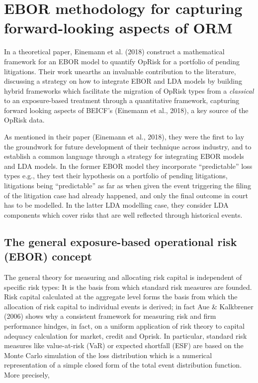 \documentclass{DissertateUSU}
\begin{document}
\section{EBOR methodology for capturing forward-looking aspects of ORM}
\label{sec:EBOR methodology for capturing forward-looking aspects of ORM}

In a theoretical paper, Einemann et al. (2018) construct a mathematical
framework for an EBOR model to quantify OpRisk for a portfolio of
pending litigations. Their work unearths an invaluable contribution to
the literature, discussing a strategy on how to integrate EBOR and LDA
models by building hybrid frameworks which facilitate the migration of
OpRisk types from a \emph{classical} to an exposure-based treatment
through a quantitative framework, capturing forward looking aspects of
BEICF's (Einemann et al., 2018), a key source of the OpRisk
data.\medskip

As mentioned in their paper (Einemann et al., 2018), they were the first
to lay the groundwork for future development of their technique across
industry, and to establish a common language through a strategy for
integrating EBOR models and LDA models. In the former EBOR model they
incorporate ``predictable'' loss types e.g., they test their hypothesis
on a portfolio of pending litigations, litigations being ``predictable''
as far as when given the event triggering the filing of the litigation
case had already happened, and only the final outcome in court has to be
modelled. In the latter LDA modelling case, they consider LDA components
which cover risks that are well reflected through historical events.

\subsection{The general exposure-based operational risk (EBOR) concept}
\label{ssec:The general exposure-based operational risk (EBOR) concept}

The general theory for measuring and allocating risk capital is
independent of specific risk types: It is the basis from which standard
risk measures are founded. Risk capital calculated at the aggregate
level forms the basis from which the allocation of risk capital to
individual events is derived; in fact Aue \& Kalkbrener (2006) shows why
a consistent framework for measuring risk and firm performance hindges,
in fact, on a uniform application of risk theory to capital adequacy
calculation for market, credit and Oprisk. In particular, standard risk
measures like value-at-risk (VaR) or expected shortfall (ESF) are based
on the Monte Carlo simulation of the loss distribution which is a
numerical representation of a simple closed form of the total event
distribution function. More precisely,
\end{document}
